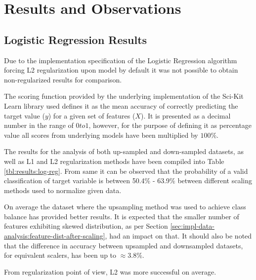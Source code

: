 \chapter{Results and Observations}\label{chp:results-and-observations}
\section{Logistic Regression Results}\label{sec:results:log-reg}

Due to the implementation specification of the Logistic Regression algorithm forcing L2 regularization upon model by default it was not possible to obtain non-regularized results for comparison.

The scoring function provided by the underlying implementation of the Sci-Kit Learn library used defines it as the mean accuracy of correctly predicting the target value ($y$) for a given set of features ($X$). It is presented as a decimal number in the range of $ 0 to 1$, however, for the purpose of defining it as percentage value all scores from underlying models have been multiplied by $100\%$.

The results for the analysis of both up-sampled and down-sampled datasets, as well as L1 and L2 regularization methods have been compiled into Table \ref{tbl:results:log-reg}. From same it can be observed that the probability of a valid classification of \isBug{} target variable is between 50.4\% - 63.9\% between different scaling methods used to normalize given data.

On average the dataset where the upsampling method was used to achieve class balance has provided better results. It is expected that the smaller number of features exhibiting skewed distribution, as per Section \ref{sec:impl-data-analysis:feature-dist-after-scaling}, had an impact on that. It should also be noted that the difference in accuracy between upsampled and downsampled datasets, for equivalent scalers, has been up to $\approx 3.8\%$.

From regularization point of view, L2 was more successful on average.

